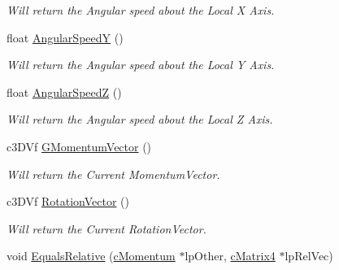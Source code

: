 \begin{DoxyCompactItemize}
\begin{DoxyCompactList}\small\item\em Will return the Angular speed about the Local X Axis. \end{DoxyCompactList}\item 
\hypertarget{classc_momentum_a0600f643a0b75be8aaedf95fa05aa6c3}{
float \hyperlink{classc_momentum_a0600f643a0b75be8aaedf95fa05aa6c3}{AngularSpeedY} ()}
\label{classc_momentum_a0600f643a0b75be8aaedf95fa05aa6c3}

\begin{DoxyCompactList}\small\item\em Will return the Angular speed about the Local Y Axis. \end{DoxyCompactList}\item 
\hypertarget{classc_momentum_ab9d37f33cc2ca5b5138d25bc8e21a39f}{
float \hyperlink{classc_momentum_ab9d37f33cc2ca5b5138d25bc8e21a39f}{AngularSpeedZ} ()}
\label{classc_momentum_ab9d37f33cc2ca5b5138d25bc8e21a39f}

\begin{DoxyCompactList}\small\item\em Will return the Angular speed about the Local Z Axis. \end{DoxyCompactList}\item 
\hypertarget{classc_momentum_a7862ced21b7c6732bc37638d166c5bda}{
c3DVf \hyperlink{classc_momentum_a7862ced21b7c6732bc37638d166c5bda}{GMomentumVector} ()}
\label{classc_momentum_a7862ced21b7c6732bc37638d166c5bda}

\begin{DoxyCompactList}\small\item\em Will return the Current MomentumVector. \end{DoxyCompactList}\item 
\hypertarget{classc_momentum_a39db7d06be015d5c2d42fd6ca3092857}{
c3DVf \hyperlink{classc_momentum_a39db7d06be015d5c2d42fd6ca3092857}{RotationVector} ()}
\label{classc_momentum_a39db7d06be015d5c2d42fd6ca3092857}

\begin{DoxyCompactList}\small\item\em Will return the Current RotationVector. \end{DoxyCompactList}\item 
\hypertarget{classc_momentum_a311a4552715fb147b96cfcefacc939e4}{
void \hyperlink{classc_momentum_a311a4552715fb147b96cfcefacc939e4}{EqualsRelative} (\hyperlink{classc_momentum}{cMomentum} $\ast$lpOther, \hyperlink{classc_matrix4}{cMatrix4} $\ast$lpRelVec)}
\label{classc_momentum_a311a4552715fb147b96cfcefacc939e4}


\end{DoxyCompactItemize}
